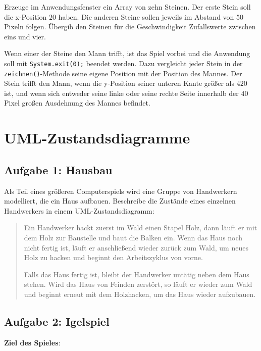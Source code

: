 \begin{compactenum}[a)]
Erzeuge im Anwendungsfenster ein Array von zehn Steinen. Der erste Stein soll
die x-Position $20$ haben. Die anderen Steine sollen jeweils im Abstand von $50$
Pixeln folgen. Übergib den Steinen für die Geschwindigkeit Zufallswerte
zwischen eins und vier.

\item Wenn einer der Steine den Mann trifft, ist das Spiel vorbei und die
Anwendung soll mit \lstinline|System.exit(0);| beendet werden. Dazu vergleicht
jeder Stein in der \lstinline|zeichnen()|-Methode seine eigene Position mit der
Position des Mannes. Der Stein trifft den Mann, wenn die y-Position seiner
unteren Kante größer als $420$ ist, und wenn sich entweder seine linke oder seine
rechte Seite innerhalb der $40$ Pixel großen Ausdehnung des Mannes befindet.
\end{compactenum}


\section{UML-Zustandsdiagramme}

\subsection{Aufgabe 1: Hausbau}

Als Teil eines größeren Computerspiels wird eine Gruppe von Handwerkern
modelliert, die ein Haus aufbauen. Beschreibe die Zustände eines einzelnen
Handwerkers in einem UML-Zustandsdiagramm:

\begin{quotation}
\noindent
Ein Handwerker hackt zuerst im Wald einen Stapel Holz, dann läuft er mit dem
Holz zur Baustelle und baut die Balken ein. Wenn das Haus noch nicht fertig
ist, läuft er anschließend wieder zurück zum Wald, um neues Holz zu hacken und
beginnt den Arbeitszyklus von vorne.

\noindent
Falls das Haus fertig ist, bleibt der Handwerker untätig neben dem Haus stehen.
Wird das Haus von Feinden zerstört, so läuft er wieder zum Wald und beginnt
erneut mit dem Holzhacken, um das Haus wieder aufzubauen.
\end{quotation}


\subsection{Aufgabe 2: Igelspiel}

\textbf{Ziel des Spieles}: 


